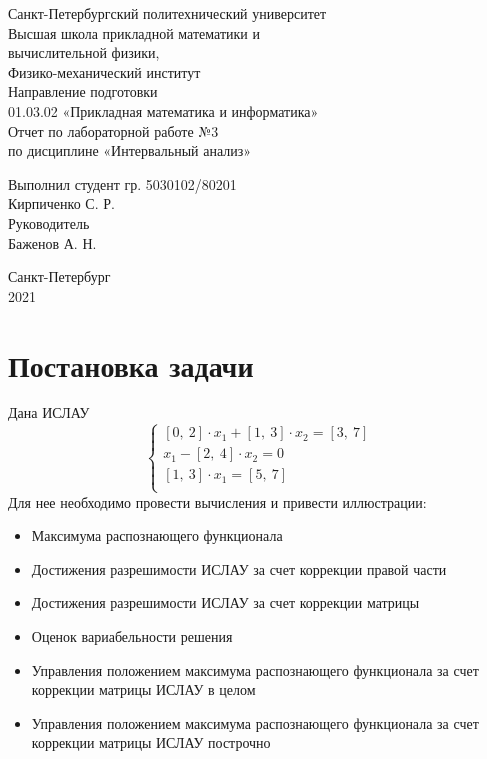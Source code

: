 \documentclass[a4paper]{article}
\begin{document}
\large
\begin{center}
    Санкт-Петербургский политехнический университет\\
    Высшая школа прикладной математики и\\вычислительной физики,\\ 
    Физико-механический институт\\
    \vspace{3em}
    Направление подготовки\\
    01.03.02 «Прикладная математика и информатика»\\
    \vspace{10em}
    \Large
    Отчет по лабораторной работе №3 \\
    по дисциплине «Интервальный анализ»
    \vspace{19em}
    \large
\end{center}
Выполнил студент гр. 5030102/80201\\
Кирпиченко С. Р.\\
Руководитель\\
Баженов А. Н.
\vspace{10em}
\begin{center}
    Санкт-Петербург\\
    2021
\end{center}
\thispagestyle{empty}
\newpage
\tableofcontents
{}
\newpage
\listoffigures
{}
\newpage
\section{Постановка задачи}
Дана ИСЛАУ 
\begin{equation}\label{islau}
    \begin{cases}
    [0,\:2]\cdot x_1+[1,\:3]\cdot x_2=[3,\:7]\\
    x_1 - [2,\:4]\cdot x_2=0\\
    [1,\:3]\cdot x_1=[5,\:7]\\
    \end{cases}
\end{equation}
Для нее необходимо провести вычисления и привести иллюстрации:
\begin{itemize}
    \item Максимума распознающего функционала
    \item Достижения разрешимости ИСЛАУ за счет коррекции правой части
    \item Достижения разрешимости ИСЛАУ за счет коррекции матрицы
    \item Оценок вариабельности решения
    \item Управления положением максимума распознающего функционала за счет коррекции матрицы ИСЛАУ в целом
    \item Управления положением максимума распознающего функционала за счет коррекции матрицы ИСЛАУ построчно
\end{itemize}
\end{document}
